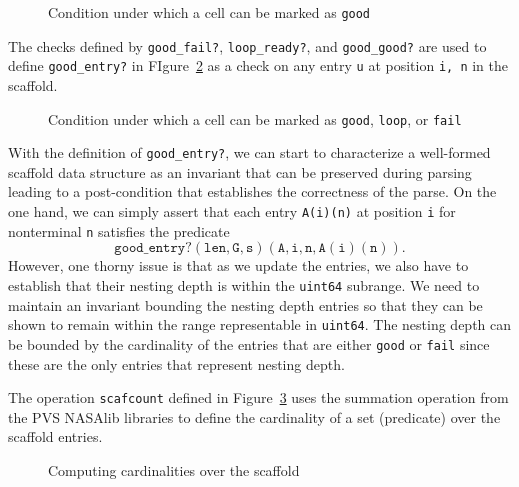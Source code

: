 \documentclass[sigplan,10pt,anonymous,review]{acmart}\settopmatter{printfolios=true,printccs=false,printacmref=false}
\begin{document}
\begin{CCSXML}
\begin{figure}[h!]
  
    \vspace*{-4mm}
			\caption{\small Condition under which a cell can be marked as \texttt{good}}
			\label{pvs:goodgood}
\end{figure}

The checks defined by \texttt{good\_fail?}, \texttt{loop\_ready?}, and \texttt{good\_good?} are used to define \texttt{good\_entry?} in FIgure~\ref{pvs:goodentry}
as a check on any entry \texttt{u}
at position \texttt{i, n} in the scaffold.  

\begin{figure}[h!]
  
    \vspace*{-4mm}
\caption{\small Condition under which a cell can be marked as \texttt{good},
  \texttt{loop}, or \texttt{fail}}
\label{pvs:goodentry}
\end{figure}

With the definition of \texttt{good\_entry?}, we can start to characterize
a well-formed scaffold data structure as an invariant that can be preserved
during parsing leading to a post-condition that establishes the correctness
of the parse.  On the one hand, we can simply assert that each entry \texttt{A(i)(n)} at position \texttt{i} for nonterminal \texttt{n}
satisfies the predicate
$$\mathtt{good\_entry?(len, G, s)(A, i, n, A(i)(n))}.$$  However, one
thorny issue is that as we update the entries, we also have to establish that their
nesting depth is within the \texttt{uint64} subrange.  We need to maintain
an invariant bounding the nesting depth entries so that they can be shown to
remain within the range representable in \texttt{uint64}\@.  The nesting
depth can be bounded by the cardinality of the entries that are
either \texttt{good} or \texttt{fail} since these are the only entries that
represent nesting depth.

The operation \texttt{scafcount} defined in Figure~\ref{pvs:scafcount}
uses the summation operation from
the PVS NASAlib libraries to define the cardinality of a set (predicate)
over the scaffold entries.  

\begin{figure}[h!]
  
    \vspace*{-4mm}
\caption{\small Computing cardinalities over the scaffold}
\label{pvs:scafcount}
\end{figure}


\end{CCSXML}
\end{document}
